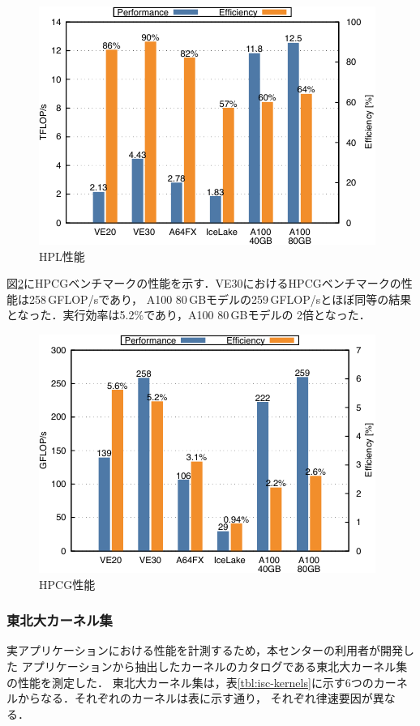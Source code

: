 ﻿\documentclass[submit,techrep,noauthor]{ipsj}
\begin{document}
\begin{figure}
  \centering
  \includegraphics{figs/hpl.pdf}
  \caption{HPL性能~\cite{Takahashi2023}}\label{fig:hpl}
\end{figure}

図\ref{fig:hpcg}にHPCGベンチマークの性能を示す．VE30におけるHPCGベンチマークの性能は258\,GFLOP/sであり，
A100 80\,GBモデルの259\,GFLOP/sとほぼ同等の結果となった．実行効率は5.2\%であり，A100 80\,GBモデルの
2倍となった．

\begin{figure}
  \centering
  \includegraphics{figs/hpcg.pdf}
  \caption{HPCG性能~\cite{Takahashi2023}}\label{fig:hpcg}
\end{figure}

\subsubsection{東北大カーネル集}

実アプリケーションにおける性能を計測するため，本センターの利用者が開発した
アプリケーションから抽出したカーネルのカタログである東北大カーネル集の性能を測定した．
東北大カーネル集は，表\ref{tbl:isc-kernels}に示す6つのカーネルからなる．それぞれのカーネルは表に示す通り，
それぞれ律速要因が異なる．
\end{document}
